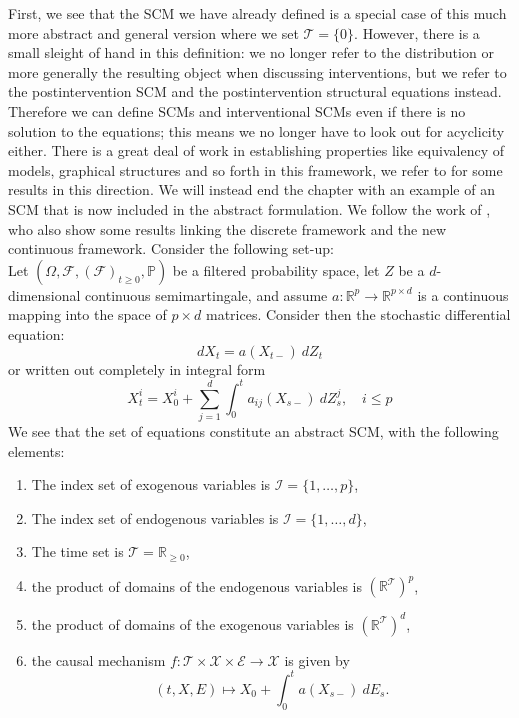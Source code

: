 \documentclass[11pt, a4paper]{memoir}
\theoremstyle{break}
\theoremstyle{break}
\theoremstyle{nonumberplain}
\newcommand{\mR}{\mathbb{R}}
\newcommand{\mP}{\mathbb{P}}
\begin{document}
First, we see that the SCM we have already defined is a special case of this much more abstract and general version where we set $\mathcal{T}=\{0\}$. However, there is a small sleight of hand in this definition: we no longer refer to the distribution or more generally the resulting object when discussing interventions, but we refer to the postintervention SCM and the postintervention structural equations instead. Therefore we can define SCMs and interventional SCMs even if there is no solution to the equations; this means we no longer have to look out for acyclicity either. There is a great deal of work in establishing properties like equivalency of models, graphical structures and so forth in this framework, we refer to \cite{SCMGen} for some results in this direction. We will instead end the chapter with an example of an SCM that is now included in the abstract formulation. We follow the work of \cite{sokol2014}, who also show some results linking the discrete framework and the new continuous framework. Consider the following set-up:\\[5pt]
Let $(\Omega, \mathcal{F},(\mathcal{F})_{t\geq 0},\mP)$ be a filtered probability space, let $Z$ be a $d$-dimensional continuous semimartingale, and assume $a:\mR^p\to \mR^{p\times d}$ is a continuous mapping into the space of $p\times d$ matrices. Consider then the stochastic differential equation:
$$dX_t=a(X_{t-})\ dZ_t$$
or written out completely in integral form
\begin{equation}\label{org}
X_t^i=X_0^i+\sum_{j=1}^d\int_0^t a_{ij}(X_{s-})\ dZ_s^j,\quad i\leqslant p
\end{equation}
We see that the set of equations constitute an abstract SCM, with the following elements:
\begin{enumerate}[label=\arabic*)]
	\item The index set of exogenous variables is $\mathcal{I}=\{1,\ldots, p\}$,
	\item The index set of endogenous variables is $\mathcal{I}=\{1,\ldots, d\}$,
	\item The time set is $\mathcal{T}=\mR_{\geqslant 0}$,
	\item the product of domains of the endogenous variables is $(\mR^{\mathcal{T}})^p$,
	\item the product of domains of the exogenous variables is $(\mR^{\mathcal{T}})^d$,
	\item the causal mechanism $f:\mathcal{T}\times \mathcal{X}\times \mathcal{E}\to \mathcal{X}$ is given by $$(t,X,E)\mapsto X_0 + \int_0^t a(X_{s-})\ dE_s.$$
\end{enumerate}
\end{document}
